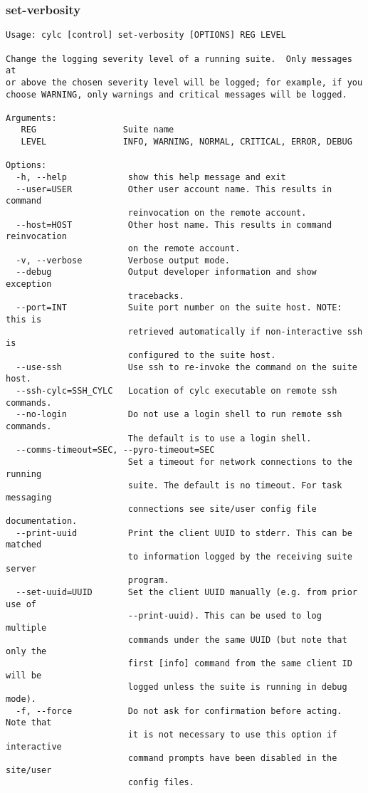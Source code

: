 \subsubsection{set-verbosity}
\label{set-verbosity}
\begin{lstlisting}
Usage: cylc [control] set-verbosity [OPTIONS] REG LEVEL 

Change the logging severity level of a running suite.  Only messages at
or above the chosen severity level will be logged; for example, if you
choose WARNING, only warnings and critical messages will be logged.

Arguments:
   REG                 Suite name
   LEVEL               INFO, WARNING, NORMAL, CRITICAL, ERROR, DEBUG

Options:
  -h, --help            show this help message and exit
  --user=USER           Other user account name. This results in command
                        reinvocation on the remote account.
  --host=HOST           Other host name. This results in command reinvocation
                        on the remote account.
  -v, --verbose         Verbose output mode.
  --debug               Output developer information and show exception
                        tracebacks.
  --port=INT            Suite port number on the suite host. NOTE: this is
                        retrieved automatically if non-interactive ssh is
                        configured to the suite host.
  --use-ssh             Use ssh to re-invoke the command on the suite host.
  --ssh-cylc=SSH_CYLC   Location of cylc executable on remote ssh commands.
  --no-login            Do not use a login shell to run remote ssh commands.
                        The default is to use a login shell.
  --comms-timeout=SEC, --pyro-timeout=SEC
                        Set a timeout for network connections to the running
                        suite. The default is no timeout. For task messaging
                        connections see site/user config file documentation.
  --print-uuid          Print the client UUID to stderr. This can be matched
                        to information logged by the receiving suite server
                        program.
  --set-uuid=UUID       Set the client UUID manually (e.g. from prior use of
                        --print-uuid). This can be used to log multiple
                        commands under the same UUID (but note that only the
                        first [info] command from the same client ID will be
                        logged unless the suite is running in debug mode).
  -f, --force           Do not ask for confirmation before acting. Note that
                        it is not necessary to use this option if interactive
                        command prompts have been disabled in the site/user
                        config files.
\end{lstlisting}
